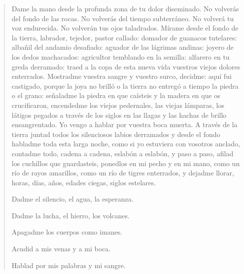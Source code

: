 \documentclass[12pt]{article}
\begin{document}
\begin{verse}
Dame la mano desde la profunda  
zona de tu dolor diseminado.  
No volverás del fondo de las rocas.  
No volverás del tiempo subterráneo.  
No volverá tu voz endurecida.  
No volverán tus ojos taladrados.  
Mírame desde el fondo de la tierra,  
labrador, tejedor, pastor callado:  
domador de guanacos tutelares:  
albañil del andamio desafiado:  
aguador de las lágrimas andinas:  
joyero de los dedos machacados:  
agricultor temblando en la semilla:  
alfarero en tu greda derramado:  
traed a la copa de esta nueva vida  
vuestros viejos dolores enterrados.  
Mostradme vuestra sangre y vuestro surco,  
decidme: aquí fui castigado,  
porque la joya no brilló o la tierra  
no entregó a tiempo la piedra o el grano:  
señaladme la piedra en que caísteis  
y la madera en que os crucificaron,  
encendedme los viejos pedernales,  
las viejas lámparas, los látigos pegados  
a través de los siglos en las llagas  
y las hachas de brillo ensangrentado.  
Yo vengo a hablar por vuestra boca muerta.  
A través de la tierra juntad todos  
los silenciosos labios derramados  
y desde el fondo habladme toda esta larga noche,  
como si yo estuviera con vosotros anclado,  
contadme todo, cadena a cadena,  
eslabón a eslabón, y paso a paso,  
afilad los cuchillos que guardasteis,  
ponedlos en mi pecho y en mi mano,  
como un río de rayos amarillos,  
como un río de tigres enterrados,  
y dejadme llorar, horas, días, años,  
edades ciegas, siglos estelares.  
	
Dadme el silencio, el agua, la esperanza.  
	
Dadme la lucha, el hierro, los volcanes.  
	
Apagadme los cuerpos como imanes.  
	
Acudid a mis venas y a mi boca.  
	
Hablad por mis palabras y mi sangre.  

\end{verse}
\end{document}
